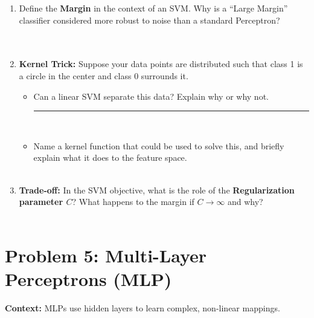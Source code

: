 \documentclass[12pt]{article}
\begin{document}
\begin{enumerate}[label=(\alph*)]
    \item Define the \textbf{Margin} in the context of an SVM. Why is a ``Large Margin'' classifier considered more robust to noise than a standard Perceptron? \\
    \fullunderline \\
    \fullunderline \\
    \fullunderline

    \item \textbf{Kernel Trick:} Suppose your data points are distributed such that class 1 is a circle in the center and class 0 surrounds it.
    \begin{itemize}
        \item Can a linear SVM separate this data? Explain why or why not. \rule{1in}{0.15mm} \\
        \fullunderline
        \item Name a kernel function that could be used to solve this, and briefly explain what it does to the feature space. \\
        \fullunderline \\
        \fullunderline
    \end{itemize}

    \item \textbf{Trade-off:} In the SVM objective, what is the role of the \textbf{Regularization parameter $C$}? What happens to the margin if $C \to \infty$ and why? \\
    \fullunderline \\
    \fullunderline
\end{enumerate}

\section{Problem 5: Multi-Layer Perceptrons (MLP)}
\textbf{Context:} MLPs use hidden layers to learn complex, non-linear mappings.
\end{document}
